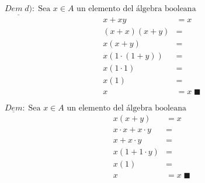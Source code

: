 \begin{multicols}{2}
	\noindent
	$\underline{Dem \;d)}:\; \text{Sea $x\in A$ un elemento del álgebra booleana}$
	\begin{align*}
		x+xy            & =x \\
		(x+x)(x+y)      & =  \\
		x(x+y)          & =  \\
		x(1\cdot (1+y)) & =  \\
		x(1\cdot 1)     & =  \\
		x(1)            & =  \\
		x               & =x \;\blacksquare
	\end{align*}

	\columnbreak
	\noindent
	$\underline{Dem}:\; \text{Sea $x\in A$ un elemento del álgebra booleana}$
	\begin{align*}
		x(x+y)             & =x  \\
		x\cdot x +x\cdot y & =   \\
		x +x\cdot y        & =   \\
		x (1 + 1\cdot y)   & =   \\
		x (1)              & =   \\
		x                  & = x \;\blacksquare
	\end{align*}
\end{multicols}
